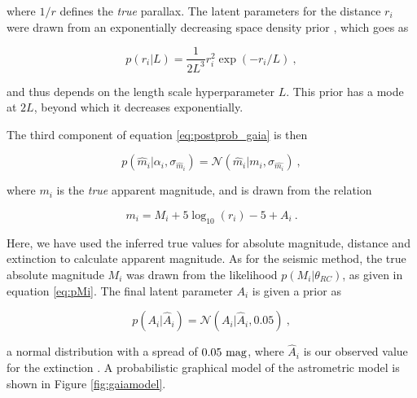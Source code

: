 \documentclass[fleqn,usenatbib]{mnras}
\newcommand{\logten}{\mbox{$\log_{10}$}\xspace}
\begin{document}
\noindent where $1/r$ defines the \emph{true} parallax. The latent parameters for the distance $r_i$ were drawn from an exponentially decreasing space density prior \citep{art:bailer-jones2015}, which goes as

\begin{equation}\label{eq:bjprior}
p(r_i | L) = \frac{1}{2L^3}r_i^2\exp(-r_i/L)\ ,
\end{equation}

\noindent and thus depends on the length scale hyperparameter $L$. This prior has a mode at $2L$, beyond which it decreases exponentially.

The third component of equation \ref{eq:postprob_gaia} is then 

\begin{equation}\label{eq:magnitude_like}
p(\hat{m}_i | \alpha_i, \sigma_{\hat{m}_i}) = \mathcal{N}(\hat{m}_i | m_i, \sigma_{\hat{m_i}})\ ,
\end{equation}

\noindent where $m_i$ is the \textit{true} apparent magnitude, and is drawn from the relation

\begin{equation}\label{eq:magnitudeequation}
m_i = M_i + 5\logten(r_i) - 5 + A_i\ .
\end{equation}

\noindent Here, we have used the inferred true values for absolute magnitude, distance and extinction to calculate apparent magnitude. As for the seismic method, the true absolute magnitude $M_i$ was drawn from the likelihood $p(M_i | \theta_{RC})$, as given in equation \ref{eq:pMi}. The final latent parameter $A_i$ is given a prior as

\begin{equation}
p(A_i | \hat{A}_i) = \mathcal{N}(A_i | \hat{A}_i, 0.05)\ ,
\end{equation}

\noindent a normal distribution with a spread of $0.05\ \rm{mag}$, where $\hat{A}_i$ is our observed value for the extinction \citep{art:green+2018}. A probabilistic graphical model of the astrometric model is shown in Figure \ref{fig:gaiamodel}.
\end{document}
